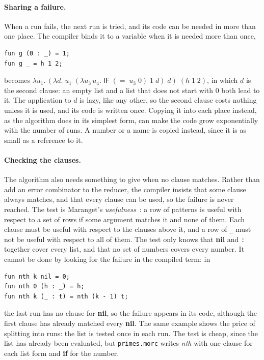 \documentclass[11pt,a4paper]{article}
\newcommand{\cmb}[1]{\textsf{#1}}
\newcommand{\IF}{\cmb{IF}}
\theoremstyle{definition}
\theoremstyle{plain}
\newcommand{\kw}[1]{\textbf{#1}}
\begin{document}
\paragraph{Sharing a failure.} When a run fails, the next run is tried, and
its code can be needed in more than one place. The compiler binds it to a
variable when it is needed more than once,
\begin{lstlisting}[style=morc]
fun g (0 : _) = 1;
fun g _ = h 1 2;
\end{lstlisting}
becomes $\lambda u_1.\,(\lambda d.\;u_1\;(\lambda u_3\,u_4.\;\IF\;({=}\;u_3\;0)\;1\;d)\;d)\;(h\;1\;2)$,
in which $d$ is the second clause: an empty list and a list that does not
start with 0 both lead to it. The application to $d$ is lazy, like any
other, so the second clause costs nothing unless it is used, and its code is
written once. Copying it into each place instead, as the algorithm does in its
simplest form, can make the code grow exponentially with the number of
runs. A number or a name is
copied instead, since it is as small as a reference to it.

\paragraph{Checking the clauses.} The algorithm also needs something to give
when no clause matches. Rather than add an error combinator to the reducer,
the compiler insists that some clause always matches, and that every clause
can be used, so the failure is never reached. The test is Maranget's
\emph{usefulness}~\cite{maranget07}: a row of patterns is useful with
respect to a set of rows if some argument matches it and none of them. Each
clause must be useful with respect to the clauses above it, and a row of
\verb|_| must not be useful with respect to all of them. The test only knows
that \kw{nil} and \verb|:| together cover every list, and that no set of
numbers covers every number. It cannot be done by looking for the failure in
the compiled term: in
\begin{lstlisting}[style=morc]
fun nth k nil = 0;
fun nth 0 (h : _) = h;
fun nth k (_ : t) = nth (k - 1) t;
\end{lstlisting}
the last run has no clause for \kw{nil}, so the failure appears in its code,
although the first clause has already matched every \kw{nil}. The same
example shows the price of splitting into runs: the list is tested once in
each run. The test is cheap, since the list has already been evaluated, but
\texttt{primes.morc} writes \textit{nth} with one clause for each list form
and \kw{if} for the number.
\end{document}
